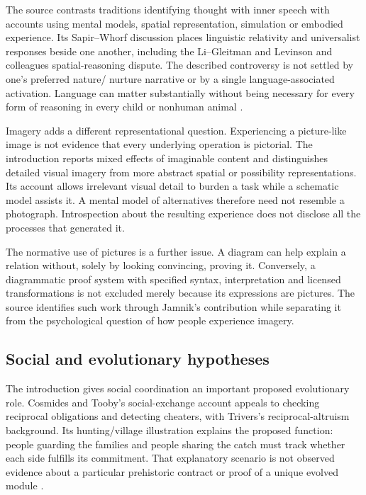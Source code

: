 The source contrasts traditions identifying thought with inner speech
with accounts using mental models, spatial representation, simulation
or embodied experience. Its Sapir--Whorf discussion places linguistic
relativity and universalist responses beside one another, including
the Li--Gleitman and Levinson and colleagues spatial-reasoning dispute.
The described controversy is not settled by one's preferred nature/
nurture narrative or by a single language-associated activation.
Language can matter substantially without being necessary for every
form of reasoning in every child or nonhuman animal
\cite[pp.~40--42]{KnauffSpohn2021FrameworksIntro}.

Imagery adds a different representational question. Experiencing a
picture-like image is not evidence that every underlying operation
is pictorial. The introduction reports mixed effects of imaginable
content and distinguishes detailed visual imagery from more abstract
spatial or possibility representations. Its account allows irrelevant
visual detail to burden a task while a schematic model assists it.
A mental model of alternatives therefore need not resemble a photograph.
Introspection about the resulting experience does not disclose all
the processes that generated it.

The normative use of pictures is a further issue. A diagram can help
explain a relation without, solely by looking convincing, proving it.
Conversely, a diagrammatic proof system with specified syntax,
interpretation and licensed transformations is not excluded merely
because its expressions are pictures. The source identifies such
work through Jamnik's contribution while separating it from the
psychological question of how people experience imagery.

\subsection{Social and evolutionary hypotheses}

The introduction gives social coordination an important proposed
evolutionary role. Cosmides and Tooby's social-exchange account appeals
to checking reciprocal obligations and detecting cheaters, with Trivers's
reciprocal-altruism background. Its hunting/village illustration
explains the proposed function: people guarding the families and people
sharing the catch must track whether each side fulfills its commitment.
That explanatory scenario is not observed evidence about a particular
prehistoric contract or proof of a unique evolved module
\cite[pp.~42--44]{KnauffSpohn2021FrameworksIntro}.

